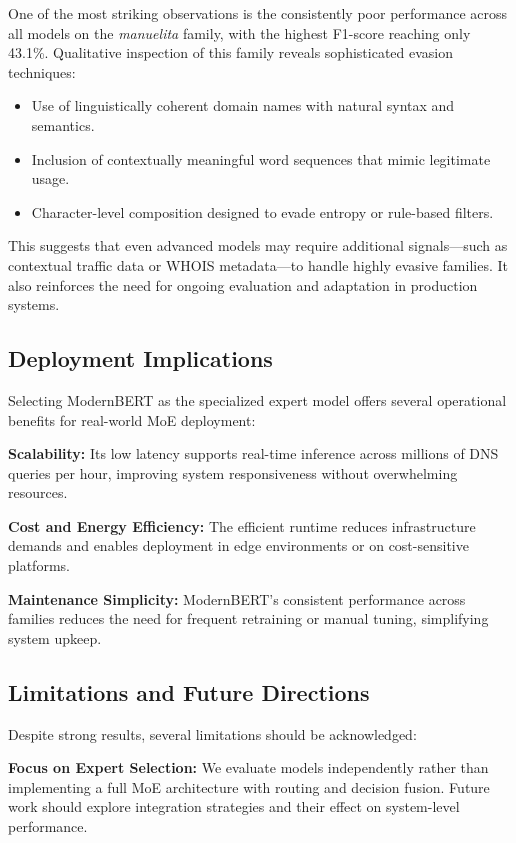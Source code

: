 \documentclass[a4paper]{llncs}
\begin{document}
One of the most striking observations is the consistently poor performance across all models on the \textit{manuelita} family, with the highest F1-score reaching only 43.1\%. Qualitative inspection of this family reveals sophisticated evasion techniques:

\begin{itemize}
\item Use of linguistically coherent domain names with natural syntax and semantics.
\item Inclusion of contextually meaningful word sequences that mimic legitimate usage.
\item Character-level composition designed to evade entropy or rule-based filters.
\end{itemize}

This suggests that even advanced models may require additional signals—such as contextual traffic data or WHOIS metadata—to handle highly evasive families. It also reinforces the need for ongoing evaluation and adaptation in production systems.

\subsection{Deployment Implications}

Selecting ModernBERT as the specialized expert model offers several operational benefits for real-world MoE deployment:

\textbf{Scalability:} Its low latency supports real-time inference across millions of DNS queries per hour, improving system responsiveness without overwhelming resources.

\textbf{Cost and Energy Efficiency:} The efficient runtime reduces infrastructure demands and enables deployment in edge environments or on cost-sensitive platforms.

\textbf{Maintenance Simplicity:} ModernBERT’s consistent performance across families reduces the need for frequent retraining or manual tuning, simplifying system upkeep.



\subsection{Limitations and Future Directions}

Despite strong results, several limitations should be acknowledged:

\textbf{Focus on Expert Selection:} We evaluate models independently rather than implementing a full MoE architecture with routing and decision fusion. Future work should explore integration strategies and their effect on system-level performance.
\end{document}
